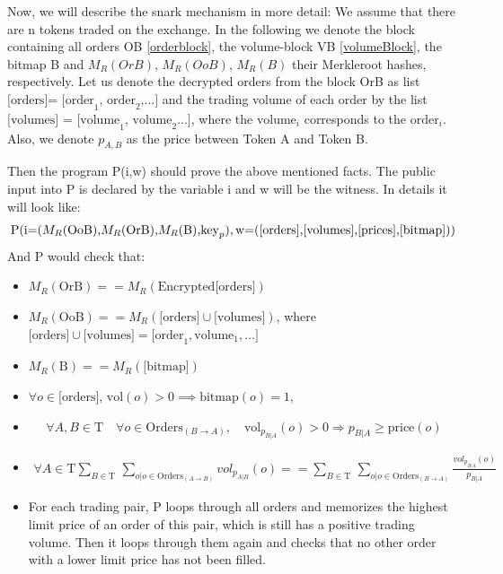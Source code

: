 \documentclass[11pt,parskip=full]{scrartcl}%
\newcommand{\Tau}{\mathrm{T}}
\begin{document}
Now, we will describe the snark mechanism in more detail: We assume that there are n tokens traded on the exchange. In the following we denote the block containing all orders OB \ref{orderblock}, the volume-block VB \ref{volumeBlock}, the bitmap B and $M_R(OrB)$, $M_R(OoB)$, $M_R(B)$ their Merkleroot hashes, respectively. Let us denote the decrypted orders from the block OrB as list $\text{[orders]= [order}_1\text{, order}_2\text{,...]}$ and the trading volume of each order by the list $\text{[volumes] = [volume}_1\text{, volume}_2\text{...]}$, where the $\text{volume}_i$ corresponds to the $\text{order}_i$. Also, we denote  $p_{A,B}$ as the price between Token A and Token B.

Then the program P(i,w) should prove the above mentioned facts. The public input into P is declared by the variable i and w will be the witness. In details it will look like:
\begin{equation}
\text{P(i=(}M_R\text{(OoB),}M_R\text{(OrB),}M_R\text{(B),} \text{key}_p),\\
\text{w=([orders],[volumes],[prices],[bitmap]))} 
\end{equation}
And P would check that:
\begin{itemize}
\item  $M_R(\text{OrB}) == M_R(\text{Encrypted[orders]})$
\item  $M_R(\text{OoB}) == M_R(\text{[orders]} \cup \text{[volumes]})$,\newline
where $\text{[orders]} \cup \text{[volumes]} = \text{[order}_1, \text{volume}_1, ...] $
\item $ M_R(\text{B}) == M_R(\text{[bitmap]})$
\item $\forall o \in \text{[orders], vol}(o)>0 \implies \text{bitmap}(o) = 1 $, 

\item 
\begin{equation} \forall A,B \in \Tau  \quad \forall o \in \text{Orders}_{(B\rightarrow A)}, \quad \text{vol}_{p_{B|A}}(o)>0 \Rightarrow p_{B|A}\geq \text{price}(o)
\end{equation}
\item 
\begin{equation}
\begin{split}
\forall A \in \Tau \sum_{B\in \Tau} \,
\sum_{o| o\in \text{Orders}_{(A\rightarrow B)}} vol_{p_{A|B}}(o) == \sum_{B\in \Tau} \, \sum_{o| o\in \text{Orders}_{(B\rightarrow A)}} \frac{vol_{p_{B|A}}(o)}{p_{B|A}}
\end{split}
\end{equation}

\item For each trading pair, P loops through all orders and memorizes the highest limit price of an order of this pair, which is still has a positive trading volume. Then it loops through them again and checks that no other order with a lower limit price has not been filled.
\end{itemize}
\end{document}
